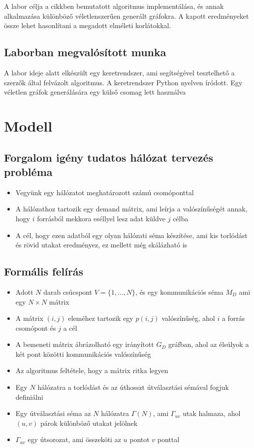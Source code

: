 \documentclass[12pt]{report}
\begin{document}
A labor célja a cikkben\cite{avin_demand-aware_nodate} bemutatott algoritmus implementálása, és annak alkalmazása különböző véletlenszerűen generált gráfokra. 
A kapott eredményeket össze lehet hasonlítani a megadott elméleti korlátokkal.

\section{Laborban megvalósított munka}

A labor ideje alatt elkészült egy keretrendszer, ami segítségével tesztelhető a szerzők által felvázolt algoritmus. 
A keretrendszer Python \cite{noauthor_python_nodate} nyelven íródott.
Egy véletlen gráfok generálására egy külső csomag lett használva \cite{noauthor_networkx_nodate}

\chapter{Modell}

\section{Forgalom igény tudatos hálózat tervezés probléma}

\begin{itemize}
	\item Vegyünk egy hálózatot meghatározott számú csomóponttal
	\item A hálózathoz tartozik egy demand mátrix, ami leírja a valószínűségét annak, hogy $i$ forrásból mekkora eséllyel lesz adat küldve $j$ célba
	\item A cél, hogy ezen adatból egy olyan hálózati séma készítése, ami kis torlódást és rövid utakat eredményez, ez mellett még skálázható is
\end{itemize}

\section{Formális felírás}

\begin{itemize}
	\item Adott $N$ darab csúcspont  $V = \{1, ..., N\}$, és egy kommunikációs séma $M_D$ ami egy $N\times N$ mátrix
	\item A mátrix $(i, j)$ eleméhez tartozik egy $p(i, j)$ valószínűség, ahol $i$ a forrás csomópont és $j$ a cél
	\item A bemeneti mátrix ábrázolható egy irányított
	$G_D$ gráfban, ahol az élsúlyok a két pont közötti kommunikációs valószínűség
	\item Az algoritmus feltétele, hogy a mátrix ritka legyen
	\item Egy $N$ hálózatra a torlódást és az úthosszt útválasztási sémával fogjuk definiálni
	\item Egy útválasztási séma az $N$ hálózatra $\Gamma(N)$, ami $\Gamma_{uv}$ utak halmaza, ahol $(u, v)$ párok különböző utakat jelölnek
	\item $\Gamma_{uv}$ egy útsorozat, ami összeköti az $u$ pontot $v$ ponttal
\end{itemize}
\end{document}
